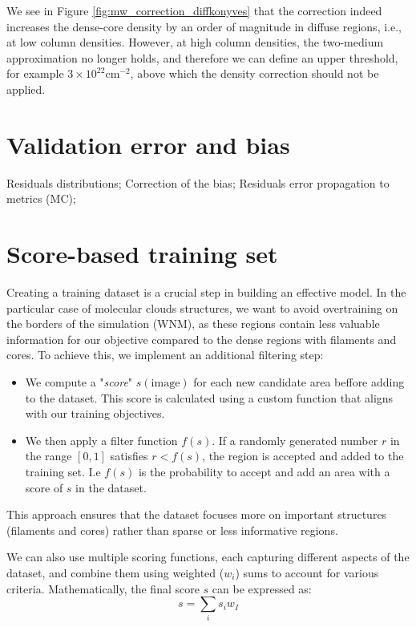 \documentclass{aa}
\begin{document}
\begin{appendix}
   We see in Figure \ref{fig:mw_correction_diffkonyves} that the correction indeed increases the dense-core density by an order of magnitude in diffuse regions, i.e., at low column densities.
   However, at high column densities, the two-medium approximation no longer holds, and therefore we can define an upper threshold,
   for example $3\times10^{22}\mathrm{cm}^{-2}$, above which the density correction should not be applied.
\section{Validation error and bias}
   \label{appendix:valerror}
   Residuals distributions; Correction of the bias; Residuals error propagation to metrics (MC);
\section{Score-based training set}
   \label{appendix:score}
   Creating a training dataset is a crucial step in building an effective model. In the particular case of molecular clouds structures,
   we want to avoid overtraining on the borders of the simulation (WNM), as these regions contain less valuable information for our objective compared to the dense regions with filaments and cores.
   To achieve this, we implement an additional filtering step:
   \begin{itemize}
      \item We compute a "\textit{score}" $s(\mathrm{image})$ for each new candidate area beffore adding to the dataset. 
      This score is calculated using a custom function that aligns with our training objectives.
      \item We then apply a filter function $f(s)$. If a randomly generated number $r$ in the range $[0,1]$ satisfies $r<f(s)$, the region is accepted and added to the training set.
      I.e $f(s)$ is the probability to accept and add an area with a score of $s$ in the dataset.
   \end{itemize}
   This approach ensures that the dataset focuses more on important structures (filaments and cores) rather than sparse or less informative regions.
   
   We can also use multiple scoring functions, each capturing different aspects of the dataset, and combine them using weighted ($w_i$) sums to account for various criteria.
   Mathematically, the final score $s$ can be expressed as:
   \begin{equation}
      s=\sum_{i}s_iw_I
   \end{equation}
   

\end{appendix}
\end{document}
